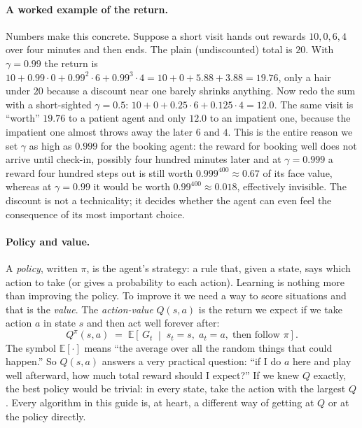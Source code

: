 \documentclass[11pt]{article}
\newcommand{\key}[1]{\textit{#1}}            %
\begin{document}
\paragraph{A worked example of the return.} Numbers make this concrete. Suppose a short
visit hands out rewards $10, 0, 6, 4$ over four minutes and then ends. The plain
(undiscounted) total is $20$. With $\gamma = 0.99$ the return is
$10 + 0.99\cdot 0 + 0.99^2\cdot 6 + 0.99^3\cdot 4 = 10 + 0 + 5.88 + 3.88 = 19.76$, only a
hair under $20$ because a discount near one barely shrinks anything. Now redo the sum with
a short-sighted $\gamma = 0.5$: $10 + 0 + 0.25\cdot 6 + 0.125\cdot 4 = 12.0$. The same
visit is ``worth'' $19.76$ to a patient agent and only $12.0$ to an impatient one,
because the impatient one almost throws away the later $6$ and $4$. This is the entire
reason we set $\gamma$ as high as $0.999$ for the booking agent: the reward for booking
well does not arrive until check-in, possibly four hundred minutes later and at
$\gamma = 0.999$ a reward four hundred steps out is still worth $0.999^{400}\approx 0.67$
of its face value, whereas at $\gamma = 0.99$ it would be worth $0.99^{400}\approx 0.018$,
effectively invisible. The discount is not a technicality; it decides whether the agent
can even feel the consequence of its most important choice.

\paragraph{Policy and value.} A \key{policy}, written $\pi$, is the agent's strategy: a
rule that, given a state, says which action to take (or gives a probability to each
action). Learning is nothing more than improving the policy. To improve it we need a way
to score situations and that is the \key{value}. The \key{action-value} $Q(s,a)$ is the
return we expect if we take action $a$ in state $s$ and then act well forever after:
\begin{equation}
Q^{\pi}(s,a) \;=\; \mathbb{E}\!\left[\,G_t \;\middle|\; s_t = s,\; a_t = a,\; \text{then follow } \pi \right].
\label{eq:qdef}
\end{equation}
The symbol $\mathbb{E}[\cdot]$ means ``the average over all the random things that could
happen.'' So $Q(s,a)$ answers a very practical question: ``if I do $a$ here and play well
afterward, how much total reward should I expect?'' If we knew $Q$ exactly, the best
policy would be trivial: in every state, take the action with the largest $Q$. Every
algorithm in this guide is, at heart, a different way of getting at $Q$ or at the policy
directly.
\end{document}
